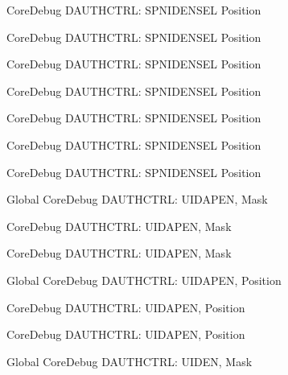 \begin{DoxyRefList}
\label{deprecated__deprecated000280}%
%
Core\+Debug DAUTHCTRL\+: SPNIDENSEL Position 

\label{deprecated__deprecated000640}%
%
Core\+Debug DAUTHCTRL\+: SPNIDENSEL Position 

\label{deprecated__deprecated000435}%
%
Core\+Debug DAUTHCTRL\+: SPNIDENSEL Position 

\label{deprecated__deprecated000359}%
%
Core\+Debug DAUTHCTRL\+: SPNIDENSEL Position 

\label{deprecated__deprecated000217}%
%
Core\+Debug DAUTHCTRL\+: SPNIDENSEL Position 

\label{deprecated__deprecated000141}%
%
Core\+Debug DAUTHCTRL\+: SPNIDENSEL Position 

\label{deprecated__deprecated000087}%
%
Core\+Debug DAUTHCTRL\+: SPNIDENSEL Position  
\item[Global \doxylink{group___c_m_s_i_s___s_c_b_gad69e7195bbc5074466387d9c4d8bd529}{Core\+Debug\+\_\+\+DAUTHCTRL\+\_\+\+UIDAPEN\+\_\+\+Msk} ]\label{deprecated__deprecated000635}%
%
Core\+Debug DAUTHCTRL\+: UIDAPEN, Mask 

\label{deprecated__deprecated000533}%
%
Core\+Debug DAUTHCTRL\+: UIDAPEN, Mask 

\label{deprecated__deprecated000082}%
%
Core\+Debug DAUTHCTRL\+: UIDAPEN, Mask  
\item[Global \doxylink{group___c_m_s_i_s___s_c_b_ga57a2ef70f6cc1e0903a8c3740512de46}{Core\+Debug\+\_\+\+DAUTHCTRL\+\_\+\+UIDAPEN\+\_\+\+Pos} ]\label{deprecated__deprecated000634}%
%
Core\+Debug DAUTHCTRL\+: UIDAPEN, Position 

\label{deprecated__deprecated000081}%
%
Core\+Debug DAUTHCTRL\+: UIDAPEN, Position 

\label{deprecated__deprecated000532}%
%
Core\+Debug DAUTHCTRL\+: UIDAPEN, Position  
\item[Global \doxylink{group___c_m_s_i_s___s_c_b_ga7d84e1642469f5c20b7ef7fa76a4fe95}{Core\+Debug\+\_\+\+DAUTHCTRL\+\_\+\+UIDEN\+\_\+\+Msk} ]\label{deprecated__deprecated000633}%
%
Core\+Debug DAUTHCTRL\+: UIDEN, Mask 


\end{DoxyRefList}
